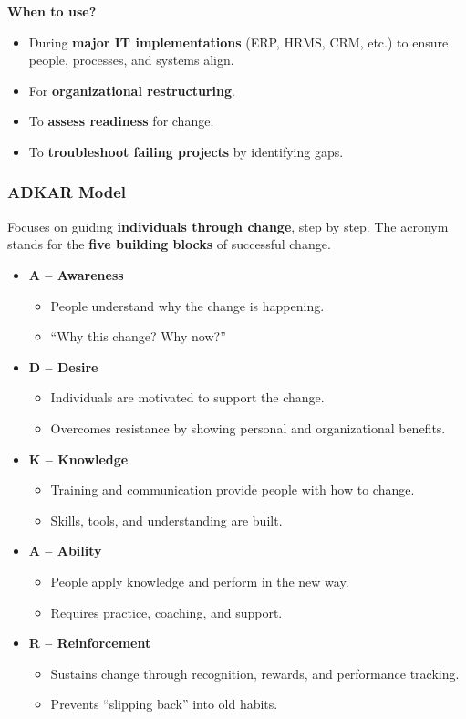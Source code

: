 \bigskip

\noindent \textbf{When to use?}

\begin{itemize}
    \item During \textbf{major IT implementations} (ERP, HRMS, CRM, etc.) to ensure people, processes, and systems align.
    \item For \textbf{organizational restructuring}.
    \item To \textbf{assess readiness} for change.
    \item To \textbf{troubleshoot failing projects} by identifying gaps.
\end{itemize}

\subsubsection{ADKAR Model}

\indent 

Focuses on guiding \textbf{individuals through change}, step by step. The acronym stands for the \textbf{five building blocks} of successful change.

\begin{itemize}
    \item \textbf{A – Awareness}
    \begin{itemize}
        \item People understand why the change is happening.
        \item “Why this change? Why now?”
    \end{itemize}
    \item \textbf{D – Desire}
    \begin{itemize}
        \item Individuals are motivated to support the change.
        \item Overcomes resistance by showing personal and organizational benefits.
    \end{itemize}
    \item \textbf{K – Knowledge}
    \begin{itemize}
        \item Training and communication provide people with how to change.
        \item Skills, tools, and understanding are built.
    \end{itemize}
    \item \textbf{A – Ability}
    \begin{itemize}
        \item People apply knowledge and perform in the new way.
        \item Requires practice, coaching, and support.
    \end{itemize}
    \item \textbf{R – Reinforcement}
    \begin{itemize}
        \item Sustains change through recognition, rewards, and performance tracking.
        \item Prevents “slipping back” into old habits.
    \end{itemize}
\end{itemize}

